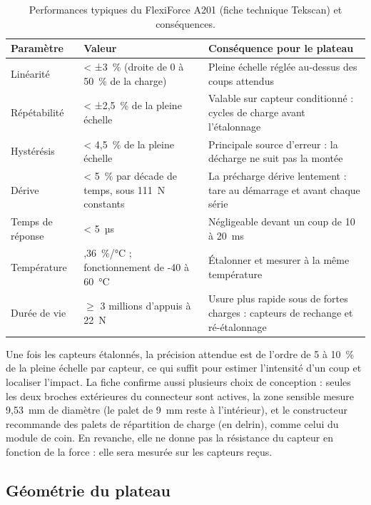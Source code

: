 \begin{table}[H]
\centering
\small
\begin{tabularx}{\textwidth}{@{}l>{\raggedright\arraybackslash}p{}>{\raggedright\arraybackslash}X@{}}
\toprule
\textbf{Paramètre} & \textbf{Valeur} & \textbf{Conséquence pour le plateau} \\
\midrule
Linéarité & < ±3~\% (droite de 0 à 50~\% de la charge) & Pleine échelle réglée au-dessus des coups attendus \\
Répétabilité & < ±2,5~\% de la pleine échelle & Valable sur capteur conditionné : cycles de charge avant l'étalonnage \\
Hystérésis & < 4,5~\% de la pleine échelle & Principale source d'erreur : la décharge ne suit pas la montée \\
Dérive & < 5~\% par décade de temps, sous 111~N constants & La précharge dérive lentement : tare au démarrage et avant chaque série \\
Temps de réponse & < 5~µs & Négligeable devant un coup de 10 à 20~ms \\
Température & 0,36~\%/°C ; fonctionnement de -40 à 60~°C & Étalonner et mesurer à la même température \\
Durée de vie & $\geq$ 3 millions d'appuis à 22~N & Usure plus rapide sous de fortes charges : capteurs de rechange et ré-étalonnage \\
\bottomrule
\end{tabularx}
\caption{Performances typiques du FlexiForce A201 (fiche technique Tekscan) et conséquences.}
\label{tab:perf}
\end{table}

Une fois les capteurs étalonnés, la précision attendue est de l'ordre de 5 à 10~\% de la pleine échelle par capteur, ce qui suffit pour estimer l'intensité d'un coup et localiser l'impact. La fiche confirme aussi plusieurs choix de conception : seules les deux broches extérieures du connecteur sont actives, la zone sensible mesure 9,53~mm de diamètre (le palet de 9~mm reste à l'intérieur), et le constructeur recommande des palets de répartition de charge (en delrin), comme celui du module de coin. En revanche, elle ne donne pas la résistance du capteur en fonction de la force : elle sera mesurée sur les capteurs reçus.

\subsection{Géométrie du plateau}

